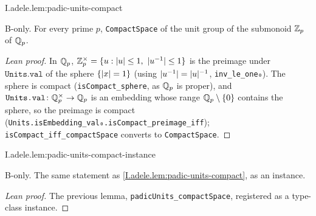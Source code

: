 \begin{lemma}
\bonly
{}
\end{lemma}
\begin{tfformal}{I.adele.lem:padic-units-compact}
\begin{tffidelity}
B-only. For every prime $p$, \texttt{CompactSpace} of the unit group of the submonoid $\mathbb{Z}_p$ of $\mathbb{Q}_p$.
\end{tffidelity}
\end{tfformal}
\begin{proof}[Lean proof]
In $\mathbb{Q}_p$, $\Zp^\times=\{u:\abs u\le1,\ \abs{u^{-1}}\le1\}$ is the preimage under $\texttt{Units.val}$ of the sphere $\{\lvert x\rvert=1\}$ (using $\lvert u^{-1}\rvert=\lvert u\rvert^{-1}$, \texttt{inv\_le\_one₀}). The sphere is compact (\texttt{isCompact\_sphere}, as $\mathbb{Q}_p$ is proper), and $\texttt{Units.val}\colon\mathbb{Q}_p^\times\to\mathbb{Q}_p$ is an embedding whose range $\mathbb{Q}_p\setminus\{0\}$ contains the sphere, so the preimage is compact (\texttt{Units.isEmbedding\_val₀.isCompact\_preimage\_iff}); \texttt{isCompact\_iff\_compactSpace} converts to \texttt{CompactSpace}.
\end{proof}

\begin{lemma}
\bonly
{}
\end{lemma}
\begin{tfformal}{I.adele.lem:padic-units-compact-instance}
\begin{tffidelity}
B-only. The same statement as \cref{I.adele.lem:padic-units-compact}, as an instance.
\end{tffidelity}
\end{tfformal}
\begin{proof}[Lean proof]
The previous lemma, \texttt{padicUnits\_compactSpace}, registered as a type-class instance.
\end{proof}

